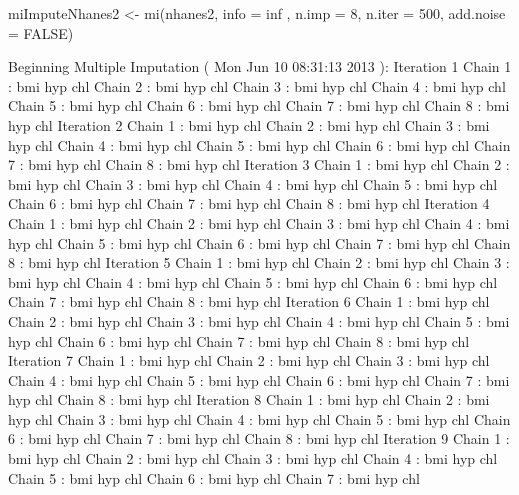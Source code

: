 \begin{Schunk}
\begin{Sinput}
 miImputeNhanes2 <- mi(nhanes2, info = inf , n.imp = 8,  n.iter = 500, add.noise = FALSE)
\end{Sinput}
\begin{Soutput}
Beginning Multiple Imputation ( Mon Jun 10 08:31:13 2013 ):
Iteration 1 
 Chain 1 : bmi   hyp   chl   
 Chain 2 : bmi   hyp   chl   
 Chain 3 : bmi   hyp   chl   
 Chain 4 : bmi   hyp   chl   
 Chain 5 : bmi   hyp   chl   
 Chain 6 : bmi   hyp   chl   
 Chain 7 : bmi   hyp   chl   
 Chain 8 : bmi   hyp   chl   
Iteration 2 
 Chain 1 : bmi   hyp   chl   
 Chain 2 : bmi   hyp   chl   
 Chain 3 : bmi   hyp   chl   
 Chain 4 : bmi   hyp   chl   
 Chain 5 : bmi   hyp   chl   
 Chain 6 : bmi   hyp   chl   
 Chain 7 : bmi   hyp   chl   
 Chain 8 : bmi   hyp   chl   
Iteration 3 
 Chain 1 : bmi   hyp   chl   
 Chain 2 : bmi   hyp   chl   
 Chain 3 : bmi   hyp   chl   
 Chain 4 : bmi   hyp   chl   
 Chain 5 : bmi   hyp   chl   
 Chain 6 : bmi   hyp   chl   
 Chain 7 : bmi   hyp   chl   
 Chain 8 : bmi   hyp   chl   
Iteration 4 
 Chain 1 : bmi   hyp   chl   
 Chain 2 : bmi   hyp   chl   
 Chain 3 : bmi   hyp   chl   
 Chain 4 : bmi   hyp   chl   
 Chain 5 : bmi   hyp   chl   
 Chain 6 : bmi   hyp   chl   
 Chain 7 : bmi   hyp   chl   
 Chain 8 : bmi   hyp   chl   
Iteration 5 
 Chain 1 : bmi   hyp   chl   
 Chain 2 : bmi   hyp   chl   
 Chain 3 : bmi   hyp   chl   
 Chain 4 : bmi   hyp   chl   
 Chain 5 : bmi   hyp   chl   
 Chain 6 : bmi   hyp   chl   
 Chain 7 : bmi   hyp   chl   
 Chain 8 : bmi   hyp   chl   
Iteration 6 
 Chain 1 : bmi   hyp   chl   
 Chain 2 : bmi   hyp   chl   
 Chain 3 : bmi   hyp   chl   
 Chain 4 : bmi   hyp   chl   
 Chain 5 : bmi   hyp   chl   
 Chain 6 : bmi   hyp   chl   
 Chain 7 : bmi   hyp   chl   
 Chain 8 : bmi   hyp   chl   
Iteration 7 
 Chain 1 : bmi   hyp   chl   
 Chain 2 : bmi   hyp   chl   
 Chain 3 : bmi   hyp   chl   
 Chain 4 : bmi   hyp   chl   
 Chain 5 : bmi   hyp   chl   
 Chain 6 : bmi   hyp   chl   
 Chain 7 : bmi   hyp   chl   
 Chain 8 : bmi   hyp   chl   
Iteration 8 
 Chain 1 : bmi   hyp   chl   
 Chain 2 : bmi   hyp   chl   
 Chain 3 : bmi   hyp   chl   
 Chain 4 : bmi   hyp   chl   
 Chain 5 : bmi   hyp   chl   
 Chain 6 : bmi   hyp   chl   
 Chain 7 : bmi   hyp   chl   
 Chain 8 : bmi   hyp   chl   
Iteration 9 
 Chain 1 : bmi   hyp   chl   
 Chain 2 : bmi   hyp   chl   
 Chain 3 : bmi   hyp   chl   
 Chain 4 : bmi   hyp   chl   
 Chain 5 : bmi   hyp   chl   
 Chain 6 : bmi   hyp   chl   
 Chain 7 : bmi   hyp   chl   

\end{Soutput}
\end{Schunk}
